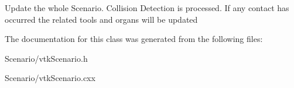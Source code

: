 Update the whole Scenario. Collision Detection is processed. If any contact has occurred the related tools and organs will be updated 

The documentation for this class was generated from the following files:\begin{DoxyCompactItemize}
\item 
Scenario/vtkScenario.h\item 
Scenario/vtkScenario.cxx\end{DoxyCompactItemize}
